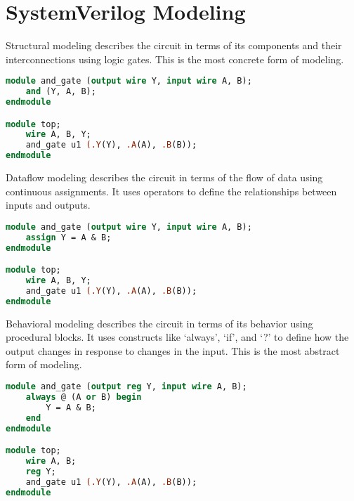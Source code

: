 \documentclass[8pt]{article}
\begin{document}
\section*{SystemVerilog Modeling}
Structural modeling describes the circuit in terms of its
components and their interconnections using logic gates. This
is the most concrete form of modeling.
\begin{lstlisting}[language=SystemVerilog, caption=Structural Modeling Example]
module and_gate (output wire Y, input wire A, B);
    and (Y, A, B);
endmodule

module top;
    wire A, B, Y;
    and_gate u1 (.Y(Y), .A(A), .B(B));
endmodule
\end{lstlisting}
Dataflow modeling describes the circuit in terms of the
flow of data using continuous assignments. It uses
operators to define the relationships between inputs
and outputs.
\begin{lstlisting}[language=SystemVerilog, caption=Dataflow Modeling Example]
module and_gate (output wire Y, input wire A, B);
    assign Y = A & B;
endmodule

module top;
    wire A, B, Y;
    and_gate u1 (.Y(Y), .A(A), .B(B));
endmodule
\end{lstlisting}
Behavioral modeling describes the circuit in terms of its
behavior using procedural blocks. It uses constructs like
`always', `if', and `?' to define how the output changes in
response to changes in the input. This is the most
abstract form of modeling.
\begin{lstlisting}[language=SystemVerilog, caption=Behavioral Modeling Example]
module and_gate (output reg Y, input wire A, B);
    always @ (A or B) begin
        Y = A & B;
    end
endmodule

module top;
    wire A, B;
    reg Y;
    and_gate u1 (.Y(Y), .A(A), .B(B));
endmodule
\end{lstlisting}
\end{document}
